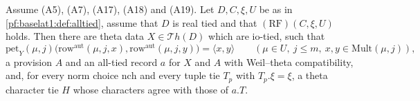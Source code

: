 \begin{theorem}\label{pf:baselat1:alltied}
Assume (A5), (A7), (A17), (A18) and (A19). Let $D,C,\xi,U$ be as in \cref{pf:baselat1:def:alltied}, assume that $D$ is
real tied and that $(\mathrm{RF})(C,\xi,U)$ holds. Then there are theta data $X\in\mathcal Th(D)$ which are
$\mathrm{io}$-tied, such that
\[
\mathrm{pet}_Y(\mu,j)\bigl(\mathrm{row}^{\mathrm{aut}}(\mu,j,x),\mathrm{row}^{\mathrm{aut}}(\mu,j,y)\bigr)=\langle x,y\rangle\qquad
(\mu\in U,\ j\le m,\ x,y\in\mathrm{Mult}(\mu,j)),
\]
a provision $A$ and an all-tied record $a$ for $X$ and $A$ with Weil--theta compatibility, and, for every norm
choice $\mathrm{nch}$ and every tuple tie $T_p$ with $T_p.\xi=\xi$, a theta character tie $H$ whose characters agree
with those of $a.T$.
\end{theorem}

